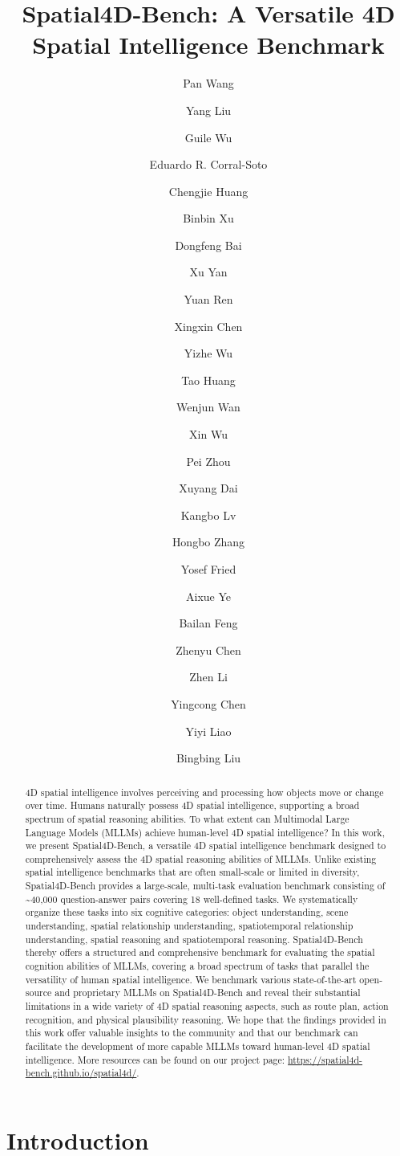 \documentclass{article}
\title{Spatial4D-Bench: A Versatile 4D Spatial Intelligence Benchmark}
\author[1,*]{Pan Wang}
\author[2,*]{Yang Liu}
\author[2]{Guile Wu}
\author[2]{Eduardo R. Corral-Soto}
\author[2]{Chengjie Huang}
\author[2]{Binbin Xu}
\author[2]{Dongfeng Bai}
\author[1]{Xu Yan}
\author[2]{Yuan Ren}
\author[2]{Xingxin Chen}
\author[1]{Yizhe Wu}
\author[1]{Tao Huang}
\author[3]{Wenjun Wan}
\author[3]{Xin Wu}
\author[3]{Pei Zhou}
\author[3]{Xuyang Dai}
\author[1,7]{Kangbo Lv}
\author[1]{Hongbo Zhang}
\author[1]{Yosef Fried}
\author[1]{Aixue Ye}
\author[1]{Bailan Feng}
\author[1]{Zhenyu Chen}
\author[4]{Zhen Li}
\author[5]{Yingcong Chen}
\author[6]{Yiyi Liao}
\author[1,$\dagger$]{Bingbing Liu}
\affil[1]{Fundation Model Dept, Huawei}
\affil[2]{Noah’s Ark Lab, Huawei}
\affil[3]{Central Media Technology Institute, Huawei}
\affil[4]{CUHK-Shenzhen}
\affil[5]{HKUST-GZ}
\affil[6]{Zhejiang University}
\affil[7]{Tsinghua University}
\begin{document}
\maketitle

\begingroup
\renewcommand\thefootnote{*}
\endgroup

\thispagestyle{fancy}


\begin{abstract}
4D spatial intelligence involves perceiving and processing how objects move or change over time. Humans naturally possess 4D spatial intelligence, supporting a broad spectrum of spatial reasoning abilities.
To what extent can Multimodal Large Language Models (MLLMs) achieve human-level 4D spatial intelligence?
In this work, we present Spatial4D-Bench, a versatile 4D spatial intelligence benchmark designed to comprehensively assess the 4D spatial reasoning abilities of MLLMs.
Unlike existing spatial intelligence benchmarks that are often small-scale or limited in diversity, Spatial4D-Bench provides a large-scale, multi-task evaluation benchmark consisting of \textasciitilde40,000 question-answer pairs covering 18 well-defined tasks. We systematically organize these tasks into six cognitive categories: object understanding, scene understanding, spatial relationship understanding, spatiotemporal relationship understanding, spatial reasoning and spatiotemporal reasoning. Spatial4D-Bench thereby offers a structured and comprehensive benchmark for evaluating the spatial cognition abilities of MLLMs, covering a broad spectrum of tasks that parallel the versatility of human spatial intelligence.
We benchmark various state-of-the-art open-source and proprietary MLLMs on Spatial4D-Bench and reveal their substantial limitations in a wide variety of 4D spatial reasoning aspects, such as route plan, action recognition, and physical plausibility reasoning. We hope that the findings provided in this work offer valuable insights to the community and that our benchmark can facilitate the development of more capable MLLMs toward human-level 4D spatial intelligence. More resources can be found on our project page: \url{https://spatial4d-bench.github.io/spatial4d/}.
\end{abstract}

    

\section{Introduction}
\label{sec:intro}
\end{document}
